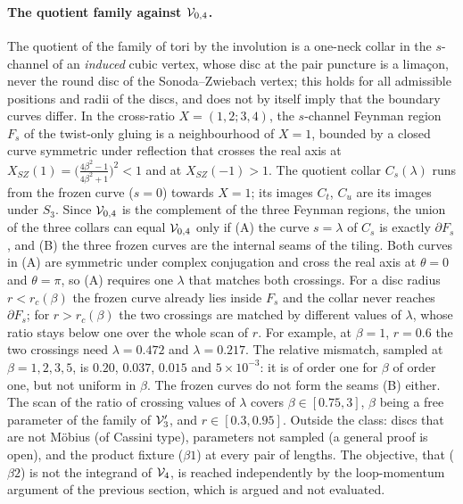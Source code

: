 \paragraph{The quotient family against ${\mathcal{V}}_{0, 4}$.}
The quotient of the family of tori by the involution is a one-neck collar in the $s$-channel of an \emph{induced} cubic vertex, whose disc at the pair puncture is a limaçon, never the round disc of the Sonoda--Zwiebach vertex; this holds for all admissible positions and radii of the discs, and does not by itself imply that the boundary curves differ.
In the cross-ratio $X = (1, 2; 3, 4)$, the $s$-channel Feynman region $F_s$ of the twist-only gluing is a neighbourhood of $X = 1$, bounded by a closed curve symmetric under reflection that crosses the real axis at $X_{SZ}(1) = \big( \tfrac{4 \beta^2 - 1}{4 \beta^2 + 1} \big)^2 < 1$ and at $X_{SZ}(- 1) > 1$.
The quotient collar $C_s(\lambda)$ runs from the frozen curve ($s = 0$) towards $X = 1$; its images $C_t$, $C_u$ are its images under $S_3$.
Since ${\mathcal{V}}_{0, 4}$ is the complement of the three Feynman regions, the union of the three collars can equal ${\mathcal{V}}_{0, 4}$ only if (A) the curve $s = \lambda$ of $C_s$ is exactly $\partial F_s$, and (B) the three frozen curves are the internal seams of the tiling.
Both curves in (A) are symmetric under complex conjugation and cross the real axis at $\theta = 0$ and $\theta = \pi$, so (A) requires one $\lambda$ that matches both crossings.
For a disc radius $r < r_c(\beta)$ the frozen curve already lies inside $F_s$ and the collar never reaches $\partial F_s$; for $r > r_c(\beta)$ the two crossings are matched by different values of $\lambda$, whose ratio stays below one over the whole scan of $r$.
For example, at $\beta = 1$, $r = 0.6$ the two crossings need $\lambda = 0.472$ and $\lambda = 0.217$.
The relative mismatch, sampled at $\beta = 1, 2, 3, 5$, is $0.20$, $0.037$, $0.015$ and $5 \times 10^{-3}$: it is of order one for $\beta$ of order one, but not uniform in $\beta$.
The frozen curves do not form the seams (B) either.
The scan of the ratio of crossing values of $\lambda$ covers $\beta \in [0.75, 3]$, $\beta$ being a free parameter of the family of ${\mathcal{V}}_3'$, and $r \in [0.3, 0.95]$.
Outside the class: discs that are not Möbius (of Cassini type), parameters not sampled (a general proof is open), and the product fixture ($\beta 1$) at every pair of lengths.
The objective, that ($\beta 2$) is not the integrand of $\mathcal{V}_{4}$, is reached independently by the loop-momentum argument of the previous section, which is argued and not evaluated.

